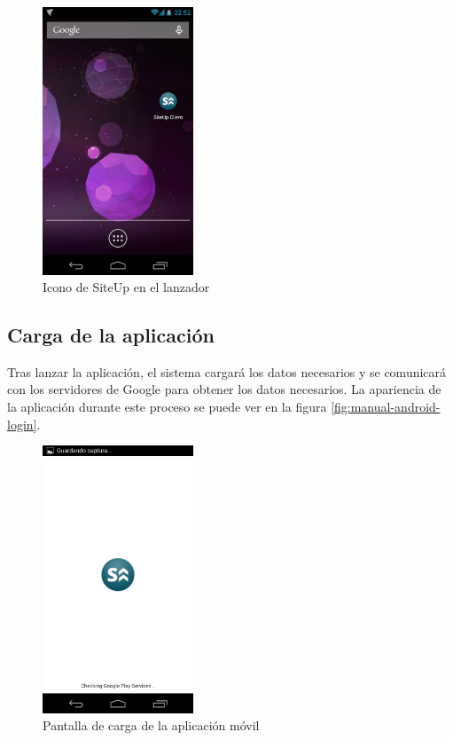 \begin{figure}[htbp]
  \centering
  \includegraphics[width=0.4\textwidth]{5_diseno/android-1}
  \caption{Icono de SiteUp en el lanzador}
  \label{fig:manual-android-launcher}
\end{figure}

\subsection{Carga de la aplicación}

Tras lanzar la aplicación, el sistema cargará los datos necesarios y se
comunicará con los servidores de Google para obtener los datos necesarios. La
apariencia de la aplicación durante este proceso se puede ver en la figura
\ref{fig:manual-android-login}.

\begin{figure}[htbp]
  \centering
  \includegraphics[width=0.4\textwidth]{5_diseno/android-2}
  \caption{Pantalla de carga de la aplicación móvil}
  \label{fig:manual-android-loading}
\end{figure}

